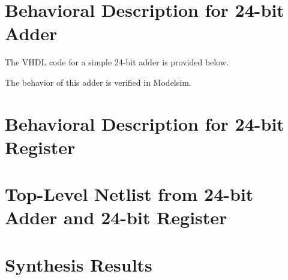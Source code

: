 \documentclass[11pt,a4paper]{article}
\begin{document}
\section{Behavioral Description for 24-bit Adder}

The VHDL code for a simple 24-bit adder is provided below. 


The behavior of this adder is verified in Modelsim. 

\section{Behavioral Description for 24-bit Register}


\section{Top-Level Netlist from 24-bit Adder and 24-bit Register}

 
\section{Synthesis Results}
\end{document}
